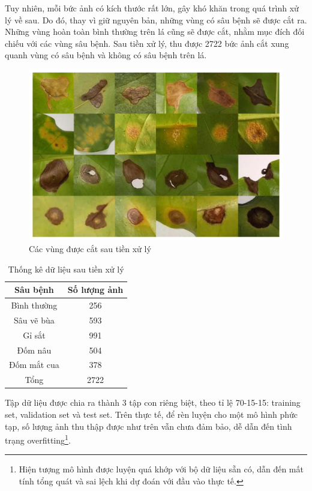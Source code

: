 \documentclass[a4paper,14pt]{extarticle}
\begin{document}
	Tuy nhiên, mỗi bức ảnh có kích thước rất lớn, gây khó khăn trong quá trình xử lý về sau. Do đó, thay vì giữ nguyên bản, những vùng có sâu bệnh sẽ được cắt ra. Những vùng hoàn toàn bình thường trên lá cũng sẽ được cắt, nhằm mục đích đối chiếu với các vùng sâu bệnh. Sau tiền xử lý, thu được 2722 bức ảnh cắt xung quanh vùng có sâu bệnh và không có sâu bệnh trên lá.
	
	\begin{figure}[H]
		\centering
		\includegraphics[scale=0.4]{images/image3}
		\caption{Các vùng được cắt sau tiền xử lý}
	\end{figure}

	\begin{table}[H]
		\centering
		\begin{tabular}{|c|c|}
		\hline
		Sâu bệnh        & Số lượng ảnh \\ \hline
		Bình thường & 256          \\
		Sâu vẽ bùa  & 593          \\
		Gỉ sắt      & 991          \\
		Đốm nâu     & 504          \\
		Đốm mắt cua & 378          \\ \hline
		Tổng        & 2722         \\ \hline
		\end{tabular}

		\caption{Thống kê dữ liệu sau tiền xử lý}
	\end{table}

	Tập dữ liệu được chia ra thành 3 tập con riêng biệt, theo tỉ lệ 70-15-15: training set, validation set và test set. Trên thực tế, để rèn luyện cho một mô hình phức tạp, số lượng ảnh thu thập được như trên vẫn chưa đảm bảo, dễ dẫn đến tình trạng overfitting\footnote{Hiện tượng mô hình được luyện quá khớp với bộ dữ liệu sẵn có, dẫn đến mất tính tổng quát và sai lệch khi dự đoán với đầu vào thực tế.}.
\end{document}
